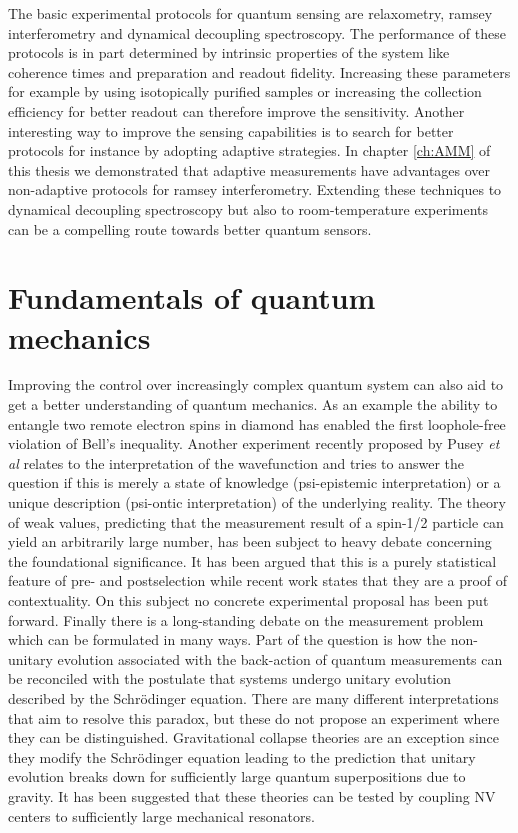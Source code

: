 The basic experimental protocols for quantum sensing are relaxometry, ramsey interferometry and dynamical decoupling spectroscopy. The performance of these protocols is in part determined by intrinsic properties of the system like coherence times and preparation and readout fidelity. Increasing these parameters for example by using isotopically purified samples or increasing the collection efficiency for better readout can therefore improve the sensitivity. Another interesting way to improve the sensing capabilities is to search for better protocols for instance by adopting adaptive strategies. In chapter \ref{ch:AMM} of this thesis we demonstrated that adaptive measurements have advantages over non-adaptive protocols for ramsey interferometry. Extending these techniques to dynamical decoupling spectroscopy but also to room-temperature experiments can be a compelling route towards better quantum sensors.

\section{Fundamentals of quantum mechanics}

Improving the control over increasingly complex quantum system can also aid to get a better understanding of quantum mechanics. As an example the ability to entangle two remote electron spins in diamond has enabled the first loophole-free violation of Bell's inequality\cite{Hensen_arXiv_2015}. Another experiment recently proposed by Pusey \textit{et al}\cite{Pusey_NatPhys_2012} relates to the interpretation of the wavefunction and tries to answer the question if this is merely a state of knowledge (psi-epistemic interpretation) or a unique description (psi-ontic interpretation) of the underlying reality. The theory of weak values, predicting that the measurement result of a spin-1/2 particle can yield an arbitrarily large number, has been subject to heavy debate concerning the foundational significance. It has been argued that this is a purely statistical feature of pre- and postselection\cite{Ferrie_Phys.Rev.Lett._2014} while recent work states that they are a proof of contextuality\cite{Pusey_Phys.Rev.Lett._2014}. On this subject no concrete experimental proposal has been put forward.
Finally there is a long-standing debate on the measurement problem which can be formulated in many ways. Part of the question is how the non-unitary evolution associated with the back-action of quantum measurements can be reconciled with the postulate that systems undergo unitary evolution described by the Schr\"{o}dinger equation. There are many different interpretations that aim to resolve this paradox, but these do not propose an experiment where they can be distinguished. Gravitational collapse theories are an exception since they modify the Schr\"{o}dinger equation leading to the prediction that unitary evolution breaks down for sufficiently large quantum superpositions due to gravity\cite{Diosi_PhysicsLettersA_1987,Penrose_Phil.Trans.R.Soc.Lond.A_1998}. It has been suggested that these theories can be tested by coupling NV centers to sufficiently large mechanical resonators.\cite{Wezel_Proc.R.Soc.A_2012}



